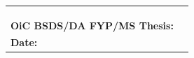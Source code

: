 \begin{table}[!ht]
\begin{adjustbox}{width=\linewidth,center}
\begin{tabular}{p{0.6cm}p{9cm}p{0.6cm}}
\multicolumn{2}{|l|}{}                                                                                                           &  \\ \cline{1-2}
\multicolumn{2}{|l|}{}                                                                                                           &  \\ \cline{1-2}
\multicolumn{2}{|l|}{}                                                                                                           &  \\ \cline{1-2}
\multicolumn{2}{l}{\textbf{OiC   BSDS/DA FYP/MS Thesis:}}                                                                                    &  \\
\textbf{Date:} &                                                                                                                 & 
\end{tabular}
\end{adjustbox}
\end{table}